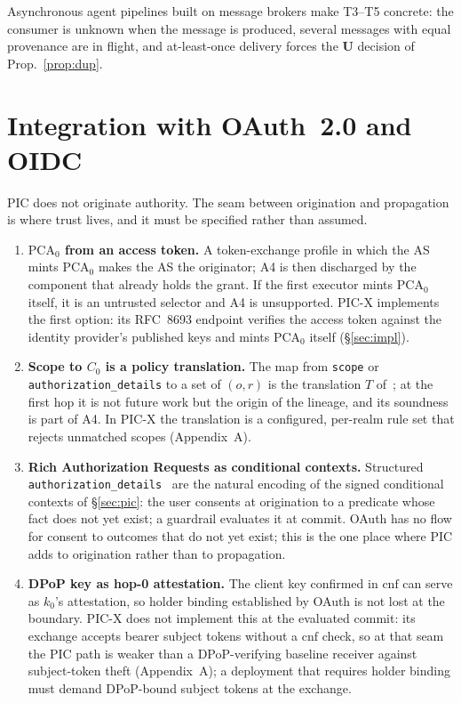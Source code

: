 \documentclass[conference]{IEEEtran}
\begin{document}
Asynchronous agent pipelines built on message brokers make T3--T5 concrete: the consumer is unknown when the message is produced, several messages with equal provenance are in flight, and at-least-once delivery forces the $\mathbf{U}$ decision of Prop.~\ref{prop:dup}.

\section{Integration with OAuth~2.0 and OIDC}\label{sec:oauth}

PIC does not originate authority. The seam between origination and propagation is where trust lives, and it must be specified rather than assumed.

\begin{enumerate}
\item \textbf{$\mathrm{PCA}_0$ from an access token.} A token-exchange profile in which the AS mints $\mathrm{PCA}_0$ makes the AS the originator; A4 is then discharged by the component that already holds the grant. If the first executor mints $\mathrm{PCA}_0$ itself, it is an untrusted selector and A4 is unsupported. PIC-X implements the first option: its RFC~8693 endpoint verifies the access token against the identity provider's published keys and mints $\mathrm{PCA}_0$ itself (\S\ref{sec:impl}).
\item \textbf{Scope to $C_0$ is a policy translation.} The map from \texttt{scope} or \texttt{authorization\_details} to a set of $(o,r)$ is the translation $T$ of~\cite{gallo2026poc}; at the first hop it is not future work but the origin of the lineage, and its soundness is part of A4. In PIC-X the translation is a configured, per-realm rule set that rejects unmatched scopes (Appendix~A).
\item \textbf{Rich Authorization Requests as conditional contexts.} Structured \texttt{authorization\_details}~\cite{rfc9396} are the natural encoding of the signed conditional contexts of \S\ref{sec:pic}: the user consents at origination to a predicate whose fact does not yet exist; a guardrail evaluates it at commit. OAuth has no flow for consent to outcomes that do not yet exist; this is the one place where PIC adds to origination rather than to propagation.
\item \textbf{DPoP key as hop-0 attestation.} The client key confirmed in $\mathrm{cnf}$ can serve as $k_0$'s attestation, so holder binding established by OAuth is not lost at the boundary. PIC-X does not implement this at the evaluated commit: its exchange accepts bearer subject tokens without a $\mathrm{cnf}$ check, so at that seam the PIC path is weaker than a DPoP-verifying baseline receiver against subject-token theft (Appendix~A); a deployment that requires holder binding must demand DPoP-bound subject tokens at the exchange.

\end{enumerate}
\end{document}
